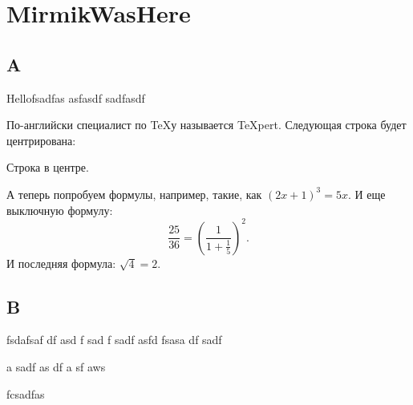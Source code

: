 
\section*{MirmikWasHere}
\label{mirmik-was-here}
\label{mirmik-was-here2}

\subsection{A}

Hellofsadfas
asfasdf
sadfasdf

По-английски специалист по \TeX у называется \TeX pert.
Следующая строка будет центрирована:
\begin{center}
Строка в центре.
\end{center}
А теперь попробуем формулы, например, такие,
как $(2x+1)^3=5x$. И еще выключную формулу:
$$\frac{25}{36}=\left(\frac{1}
{1+\frac{1}{5}}\right)^2.
$$
И последняя формула: $\sqrt{4} = 2$.



\subsection{B}
fsdafsaf
df
asd
f
sad
f
sadf
asfd   fsasa
df
sadf

a 
sadf
as 
df
 a
 sf
  aws




  fcsadfas